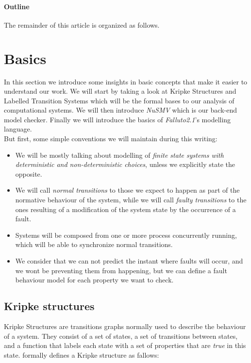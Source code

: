 \documentclass[12pt]{article}
\newcommand{\falluto}{\mbox{\textit{Falluto2.1}}}
\begin{document}
\paragraph{Outline}
The remainder of this article is organized as follows.





\section{Basics}\label{basics}
In this section we introduce some insights in basic concepts that make it
easier to understand our work. We will start by taking a look at Kripke Structures and Labelled Transition Systems which will be the formal bases to our analysis of computational systems. We will then introduce \mbox{\textit{NuSMV}} which is our back-end model checker. Finally we will introduce the basics of \falluto 's modelling language.\\
But first, some simple conventions we will maintain during this writing:
\begin{itemize}
\item We will be mostly talking about modelling of \textit{finite state systems with deterministic and non-deterministic choices}, unless we explicitly state the opposite.
\item We will call \textit{normal transitions} to those we expect to happen as part of the normative behaviour of the system, while we will call \textit{faulty transitions} to the ones resulting of a modification of the system state by the occurrence of a fault.
\item Systems will be composed from one or more process concurrently running, which will be able to synchronize normal transitions.
\item We consider that we can not predict the instant where faults will occur, and we wont be preventing them from happening, but we can define a fault behaviour model for each property we want to check.
\end{itemize}

\subsection{Kripke structures}\label{kripke} %
Kripke Structures are transitions graphs normally used to describe the behaviour of a system. They consist of a set of states, a set of transitions between states, and a function that labels each state with a set of properties that are \textit{true} in this state. \cite{clarke} formally defines a Kripke structure as fallows:\\
\end{document}
